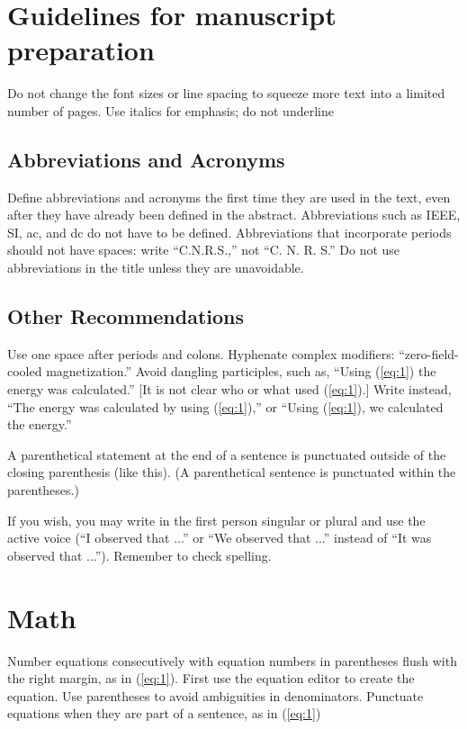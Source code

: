 \documentclass[conference]{IEEEtran}
\begin{document}
\section{Guidelines for manuscript preparation}
\label{sec:op}

Do not change the font sizes or line spacing to squeeze more text into a limited number of pages. Use italics for emphasis; do not underline


\subsection{Abbreviations and Acronyms}

Define abbreviations and acronyms the first time they are used in the text, even after they have already been defined in the abstract. Abbreviations such as IEEE, SI, ac, and dc do not have to be defined. Abbreviations that incorporate periods should not have spaces: write “C.N.R.S.,” not “C. N. R. S.” Do not use abbreviations in the title unless they are unavoidable.

\subsection{Other Recommendations}

Use one space after periods and colons. Hyphenate complex modifiers: “zero-field-cooled magnetization.” Avoid dangling participles, such as, “Using (\ref{eq:1}) the energy was calculated.” [It is not clear who or what used (\ref{eq:1}).] Write instead, “The energy was calculated by using (\ref{eq:1}),” or “Using (\ref{eq:1}), we calculated the energy.”



A parenthetical statement at the end of a sentence is punctuated outside of the closing parenthesis (like this). (A parenthetical sentence is punctuated within the parentheses.) 

If you wish, you may write in the first person singular or plural and use the active voice (“I observed that ...” or “We observed that ...” instead of “It was observed that ...”). Remember to check spelling. 


\section{Math}

Number equations consecutively with equation numbers in parentheses flush with the right margin, as in (\ref{eq:1}). First use the equation editor to create the equation. Use parentheses to avoid ambiguities in denominators. Punctuate equations when they are part of a sentence, as in (\ref{eq:1})
\end{document}
